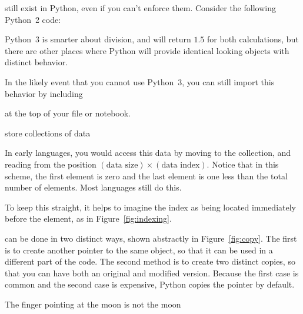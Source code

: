 \documentclass[justified, nobib]{tufte-handout}
\begin{document}
\vspace{5mm}

 still exist in Python, even if you can't enforce them.
Consider the following Python~2 code:

Python~3 is smarter about division, and will return $1.5$ for both calculations, but there are other places where Python will provide identical looking objects with distinct behavior.

\noindent
In the likely event that you cannot use Python~3, you can still import this behavior by including

\hspace{25pt}

\noindent
at the top of your file or notebook.

 store collections of data


\noindent
In early languages, you would access this data by moving to the collection, and reading from the position $(\text{data size}) \times (\text{data index})$.
Notice that in this scheme, the first element is zero and the last element is one less than the total number of elements.
Most languages still do this.



\begin{marginfigure}
    \def\svgwidth{150pt}{}
    \caption{%
    How to count in Python.
    Shaded elements correspond to those selected by indices [1:4]%
    }
\label{fig:indexing}
\end{marginfigure}

\noindent
To keep this straight, it helps to imagine the index as being located immediately before the element, as in Figure~\ref{fig:indexing}.

\smallskip

 can be done in two distinct ways, shown abstractly in Figure~\ref{fig:copy}.
The first is to create another pointer to the same object, so that it can be used in a different part of the code.
The second method is to create two distinct copies, so that you can have both an original and modified version.
Because the first case is common and the second case is expensive, Python copies the pointer by default.
\begin{marginfigure}[60pt]
    \vspace*{\fill}
    \centering
    \subfloat[Case 1]{\scalebox{1}{}}

    \vfill

    \subfloat[Case 2]{\scalebox{0.69}{}}
  \caption{The finger pointing at the moon is not the moon}
\label{fig:copy}
\end{marginfigure}

\end{document}
